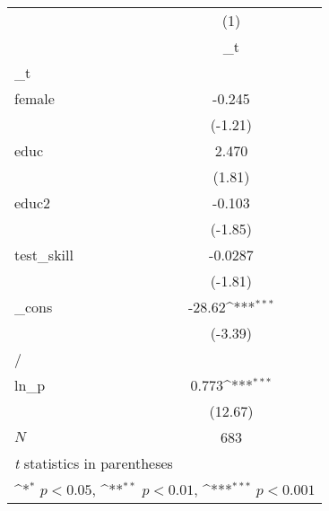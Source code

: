 {
\def\sym#1{\ifmmode^{#1}\else\(^{#1}\)\fi}
\begin{tabular}{l*{1}{c}}
\hline\hline
            &\multicolumn{1}{c}{(1)}\\
            &\multicolumn{1}{c}{\_t}\\
\hline
\_t          &                     \\
female      &      -0.245         \\
            &     (-1.21)         \\
[1em]
educ        &       2.470         \\
            &      (1.81)         \\
[1em]
educ2       &      -0.103         \\
            &     (-1.85)         \\
[1em]
test\_skill  &     -0.0287         \\
            &     (-1.81)         \\
[1em]
\_cons      &      -28.62\sym{***}\\
            &     (-3.39)         \\
\hline
/           &                     \\
ln\_p        &       0.773\sym{***}\\
            &     (12.67)         \\
\hline
\(N\)       &         683         \\
\hline\hline
\multicolumn{2}{l}{\footnotesize \textit{t} statistics in parentheses}\\
\multicolumn{2}{l}{\footnotesize \sym{*} \(p<0.05\), \sym{**} \(p<0.01\), \sym{***} \(p<0.001\)}\\
\end{tabular}
}
